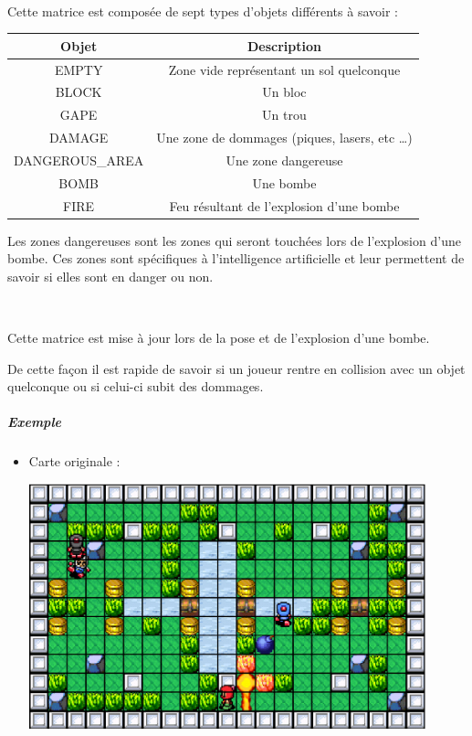 {			$\,$
			
			Cette matrice est composée de sept types d'objets différents à savoir :
			
			\begin{center}
				\begin{tabular}{|c|c|} \hline
				Objet  & Description \\\hline
				EMPTY  & Zone vide représentant un sol quelconque\\\hline
				BLOCK  & Un bloc \\\hline
				GAPE   & Un trou \\\hline
				DAMAGE & Une zone de dommages (piques, lasers, etc \ldots) \\\hline
				DANGEROUS\_AREA & Une zone dangereuse\\\hline
				BOMB & Une bombe\\\hline
				FIRE & Feu résultant de l'explosion d'une bombe\\\hline
				\end{tabular}
			\end{center}
			
			Les zones dangereuses sont les zones qui seront touchées lors de l'explosion
			d'une bombe. Ces zones sont spécifiques à l'intelligence artificielle et leur
			permettent de savoir si elles sont en danger ou non.
			
			
			$\,$
			
			Cette matrice est mise à jour lors de la pose et de l'explosion d'une bombe.
			
			De cette façon il est rapide de savoir si un joueur rentre en collision avec
			un objet quelconque ou si celui-ci subit des dommages.
			
			\subparagraph{Exemple}
			
				\begin{itemize}
				  \item Carte originale :
				  
						\begin{center}						
							\includegraphics[width=115mm,height=71mm]{Developpement/Img/mapcolision_1.eps}
						\end{center}				  		
				  

\end{itemize}}
